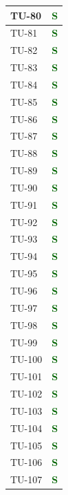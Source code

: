 \begin{longtable}{|C{2.5cm}|C{2.5cm}|}
	\hline
	{TU-80} & \textcolor{darkgreen}{\textbf{S}}\\
	\hline
	{TU-81} & \textcolor{darkgreen}{\textbf{S}}\\
	\hline
	{TU-82} & \textcolor{darkgreen}{\textbf{S}}\\
	\hline
	{TU-83} & \textcolor{darkgreen}{\textbf{S}}\\
	\hline
	{TU-84} & \textcolor{darkgreen}{\textbf{S}}\\
	\hline
	{TU-85} & \textcolor{darkgreen}{\textbf{S}}\\
	\hline
	{TU-86} & \textcolor{darkgreen}{\textbf{S}}\\
	\hline
	{TU-87} & \textcolor{darkgreen}{\textbf{S}}\\
	\hline
	{TU-88} & \textcolor{darkgreen}{\textbf{S}}\\
	\hline
	{TU-89} & \textcolor{darkgreen}{\textbf{S}}\\
	\hline
	{TU-90} & \textcolor{darkgreen}{\textbf{S}}\\
	\hline
	{TU-91} & \textcolor{darkgreen}{\textbf{S}}\\
	\hline
	{TU-92} & \textcolor{darkgreen}{\textbf{S}}\\
	\hline
	{TU-93} & \textcolor{darkgreen}{\textbf{S}}\\
	\hline
	{TU-94} & \textcolor{darkgreen}{\textbf{S}}\\
	\hline
	{TU-95} & \textcolor{darkgreen}{\textbf{S}}\\
	\hline
	{TU-96} & \textcolor{darkgreen}{\textbf{S}}\\
	\hline
	{TU-97} & \textcolor{darkgreen}{\textbf{S}}\\
	\hline
	{TU-98} & \textcolor{darkgreen}{\textbf{S}}\\
	\hline
	{TU-99} & \textcolor{darkgreen}{\textbf{S}}\\
	\hline
	{TU-100} & \textcolor{darkgreen}{\textbf{S}}\\
	\hline
	{TU-101} & \textcolor{darkgreen}{\textbf{S}}\\
	\hline
	{TU-102} & \textcolor{darkgreen}{\textbf{S}}\\
	\hline
	{TU-103} & \textcolor{darkgreen}{\textbf{S}}\\
	\hline
	{TU-104} & \textcolor{darkgreen}{\textbf{S}}\\
	\hline
	{TU-105} & \textcolor{darkgreen}{\textbf{S}}\\
	\hline
	{TU-106} & \textcolor{darkgreen}{\textbf{S}}\\
	\hline
	{TU-107} & \textcolor{darkgreen}{\textbf{S}}\\

\end{longtable}
